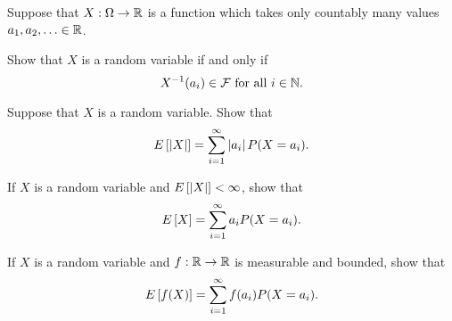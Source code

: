 \begin{exercise}{2.1}
    Suppose that $X:\Omega\to\mathbb{R}$ is a function which takes only countably 
    many values $a_1, a_2, \ldots\in\mathbb{R}$. 
    \begin{thmenum}
        \item Show that $X$ is a random variable if and only if 
        \begin{equation*}
            X^{-1}(a_i) \in \mathcal{F} \text{ for all } i\in\mathbb{N}.
        \end{equation*}
        \item Suppose that $X$ is a random variable. Show that 
        \begin{equation*}
            E\left[ {\left\lvert {X} \right\rvert} \right] = \sum_{i=1}^\infty \left\lvert {a_i} \right\rvert P(X = a_i).
        \end{equation*}
        \item If $X$ is a random variable and $E\left[ {\left\lvert {X} \right\rvert} \right]<\infty$, 
        show that 
        \begin{equation*}
            E\left[ {X} \right] = \sum_{i=1}^\infty a_i P(X = a_i).
        \end{equation*}
        \item If $X$ is a random variable and $f:\mathbb{R}\to\mathbb{R}$ is measurable and 
        bounded, show that 
        \begin{equation*}
            E\left[ {f(X)} \right] = \sum_{i=1}^\infty f(a_i) P(X = a_i).
        \end{equation*}
    \end{thmenum}
\end{exercise}
